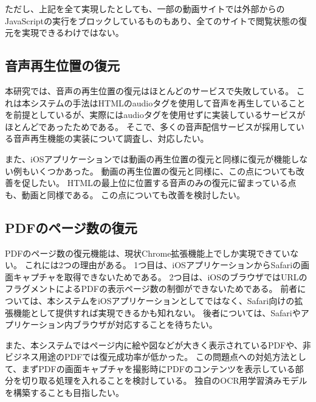 ただし、上記を全て実現したとしても、一部の動画サイトでは外部からのJavaScriptの実行をブロックしているものもあり、全てのサイトで閲覧状態の復元を実現できるわけではない。

\subsection{音声再生位置の復元}
本研究では、音声の再生位置の復元はほとんどのサービスで失敗している。
これは本システムの手法はHTMLのaudioタグを使用して音声を再生していることを前提としているが、実際にはaudioタグを使用せずに実装しているサービスがほとんどであったためである。
そこで、多くの音声配信サービスが採用している音声再生機能の実装について調査し、対応したい。

また、iOSアプリケーションでは動画の再生位置の復元と同様に復元が機能しない例もいくつかあった。
動画の再生位置の復元と同様に、この点についても改善を促したい。
HTMLの最上位に位置する音声のみの復元に留まっている点も、動画と同様である。
この点についても改善を検討したい。

\subsection{PDFのページ数の復元}
PDFのページ数の復元機能は、現状Chrome拡張機能上でしか実現できていない。
これには2つの理由がある。
1つ目は、iOSアプリケーションからSafariの画面キャプチャを取得できないためである。
2つ目は、iOSのブラウザではURLのフラグメントによるPDFの表示ページ数の制御ができないためである。
前者については、本システムをiOSアプリケーションとしてではなく、Safari向けの拡張機能として提供すれば実現できるかも知れない。
後者については、Safariやアプリケーション内ブラウザが対応することを待ちたい。

また、本システムではページ内に絵や図などが大きく表示されているPDFや、非ビジネス用途のPDFでは復元成功率が低かった。
この問題点への対処方法として、まずPDFの画面キャプチャを撮影時にPDFのコンテンツを表示している部分を切り取る処理を入れることを検討している。
独自のOCR用学習済みモデルを構築することも目指したい。
